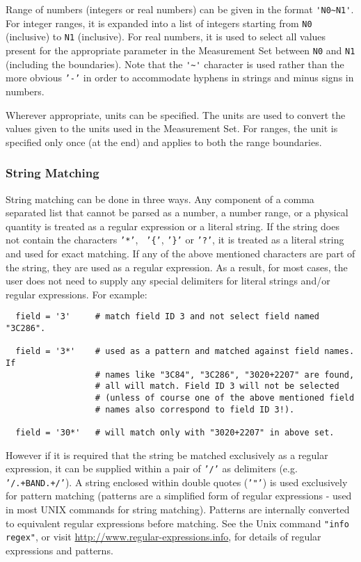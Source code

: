 Range of numbers (integers or real numbers) can be given in the format
{\verb!'N0~N1'!}.  For integer ranges, it is expanded into a list of integers
starting from {\tt N0} (inclusive) to {\tt N1} (inclusive).  For real numbers, it
is used to select all values present for the appropriate parameter in
the Measurement Set between {\tt N0} and {\tt N1} (including the
boundaries).  Note that the {\verb!'~'!} character is used rather than the
more obvious {\tt '-'} in order to accommodate hyphens in strings and
minus signs in numbers.

Wherever appropriate, units can be specified.  The
units are used to convert the values given to the units used in the
Measurement Set.  For ranges, the unit is specified only once (at
the end) and applies to both the range boundaries.

\subsubsection{String Matching}
\label{section:io.selection.syntax.string}

String matching can be done in three ways. Any component of a comma
separated list that cannot be parsed as a number, a number range, or
a physical quantity is treated as a regular expression or a literal
string. If the string does not contain the characters {\tt '*'}, {\tt
'\{'}, {\tt '\}'} or {\tt '?'}, it is treated as a literal string and
used for exact matching. If any of the above mentioned characters are
part of the string, they are used as a regular expression. As a result,
for most cases, the user does not need to supply any special
delimiters for literal strings and/or regular expressions.  For
example:
\small
\begin{verbatim}
  field = '3'     # match field ID 3 and not select field named "3C286".

  field = '3*'    # used as a pattern and matched against field names. If
                  # names like "3C84", "3C286", "3020+2207" are found,
                  # all will match. Field ID 3 will not be selected
                  # (unless of course one of the above mentioned field
                  # names also correspond to field ID 3!). 

  field = '30*'   # will match only with "3020+2207" in above set. 
\end{verbatim}
\normalsize
However if it is required that the string be matched exclusively as a
regular expression, it can be supplied within a pair of {\tt '/'} as
delimiters (e.g. {\tt '/.+BAND.+/'}). A string enclosed within double
quotes ({\tt '"'}) is used exclusively for pattern matching (patterns
are a simplified form of regular expressions - used in most UNIX
commands for string matching). Patterns are internally converted to
equivalent regular expressions before matching. See the
Unix command {\tt "info regex"}, or visit
\url{http://www.regular-expressions.info}, for details of regular
expressions and patterns.

